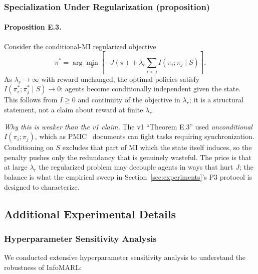 \documentclass[10pt, letterpaper]{article}
\begin{document}
\subsubsection{Specialization Under Regularization (proposition)}

\paragraph{Proposition E.3.} Consider the conditional-MI regularized objective
\[\pi^* = \arg\min_{\pi} \left[-J(\pi) + \lambda_r \sum_{i<j} I(\pi_i; \pi_j \mid S)\right].\]
As $\lambda_r \to \infty$ with reward unchanged, the optimal policies satisfy $I(\pi^*_i; \pi^*_j \mid S) \to 0$: agents become conditionally independent given the state. This follows from $I \geq 0$ and continuity of the objective in $\lambda_r$; it is a structural statement, not a claim about reward at finite $\lambda_r$.

\emph{Why this is weaker than the v1 claim.} The v1 ``Theorem E.3'' used \emph{unconditional} $I(\pi_i;\pi_j)$, which as PMIC~\cite{li2022pmic} documents can fight tasks requiring synchronization. Conditioning on $S$ excludes that part of MI which the state itself induces, so the penalty pushes only the redundancy that is genuinely wasteful. The price is that at large $\lambda_r$ the regularized problem may decouple agents in ways that hurt $J$; the balance is what the empirical sweep in Section~\ref{sec:experiments}'s P3 protocol is designed to characterize.

\subsection{Additional Experimental Details}

\subsubsection{Hyperparameter Sensitivity Analysis}

We conducted extensive hyperparameter sensitivity analysis to understand the robustness of InfoMARL:
\end{document}
